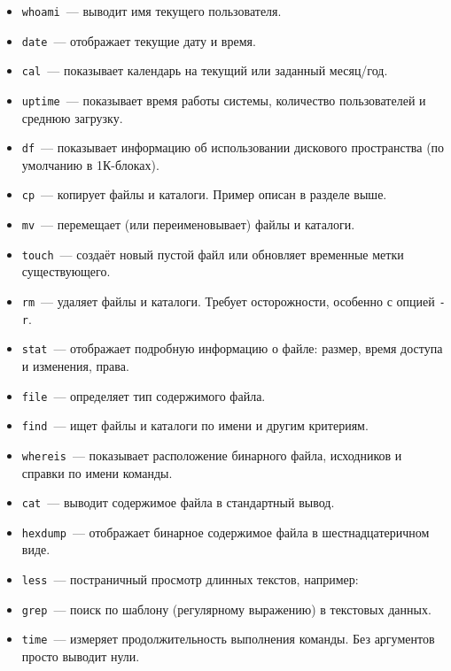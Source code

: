 \begin{itemize}
    \item \texttt{whoami}~--- выводит имя текущего пользователя.
    
    \item \texttt{date}~--- отображает текущие дату и время.

    \item \texttt{cal}~--- показывает календарь на текущий или заданный месяц/год.

    \item \texttt{uptime}~--- показывает время работы системы, количество пользователей и среднюю загрузку.

    \item \texttt{df}~--- показывает информацию об использовании дискового пространства (по умолчанию в 1К-блоках).

    \item \texttt{cp}~--- копирует файлы и каталоги. Пример описан в разделе выше.

    \item \texttt{mv}~--- перемещает (или переименовывает) файлы и каталоги.

    \item \texttt{touch}~--- создаёт новый пустой файл или обновляет временные метки существующего.

    \item \texttt{rm}~--- удаляет файлы и каталоги. Требует осторожности, особенно с опцией \texttt{-r}.

    \item \texttt{stat}~--- отображает подробную информацию о файле: размер, время доступа и изменения, права.

    \item \texttt{file}~--- определяет тип содержимого файла.

    \item \texttt{find}~--- ищет файлы и каталоги по имени и другим критериям.

    \item \texttt{whereis}~--- показывает расположение бинарного файла, исходников и справки по имени команды.

    \item \texttt{cat}~--- выводит содержимое файла в стандартный вывод.

    \item \texttt{hexdump}~--- отображает бинарное содержимое файла в шестнадцатеричном виде.

    \item \texttt{less}~--- постраничный просмотр длинных текстов, например:

    \item \texttt{grep}~--- поиск по шаблону (регулярному выражению) в текстовых данных.

    \item \texttt{time}~--- измеряет продолжительность выполнения команды. Без аргументов просто выводит нули.

\end{itemize}

